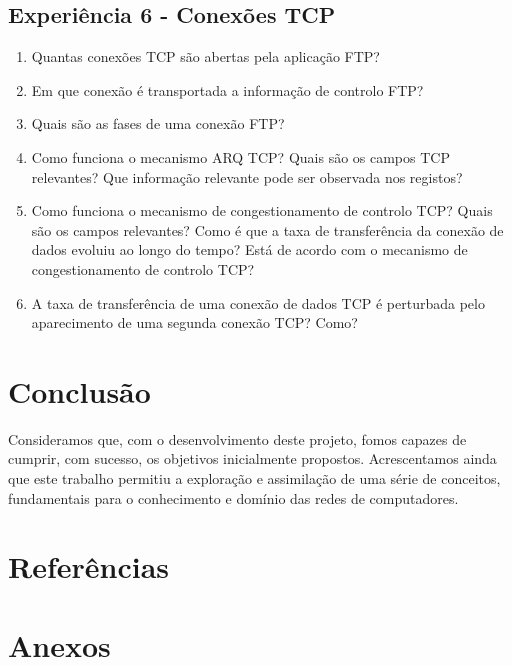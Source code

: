 \documentclass{article}
\begin{document}
\subsection{Experiência 6 - Conexões TCP}
\begin{enumerate}
\item Quantas conexões TCP são abertas pela aplicação FTP?

\item Em que conexão é transportada a informação de controlo FTP?

\item Quais são as fases de uma conexão FTP?

\item Como funciona o mecanismo ARQ TCP? Quais são os campos TCP relevantes? Que informação relevante pode ser observada nos
registos?

\item Como funciona o mecanismo de congestionamento de controlo TCP? Quais são os campos relevantes? Como é que
a taxa de transferência da conexão de dados evoluiu ao longo do tempo? Está de acordo com o mecanismo de congestionamento de controlo TCP?

\item A taxa de transferência de uma conexão de dados TCP é perturbada pelo aparecimento de uma segunda conexão TCP? Como?
\end{enumerate}
\section{Conclusão}
Consideramos que, com o desenvolvimento deste projeto, fomos capazes de cumprir, com sucesso, os objetivos inicialmente propostos.  Acrescentamos ainda que este trabalho permitiu a exploração e assimilação de uma série de conceitos, fundamentais para o conhecimento e domínio das redes de computadores.  
\section{Referências}
\section{Anexos}
\end{document}
